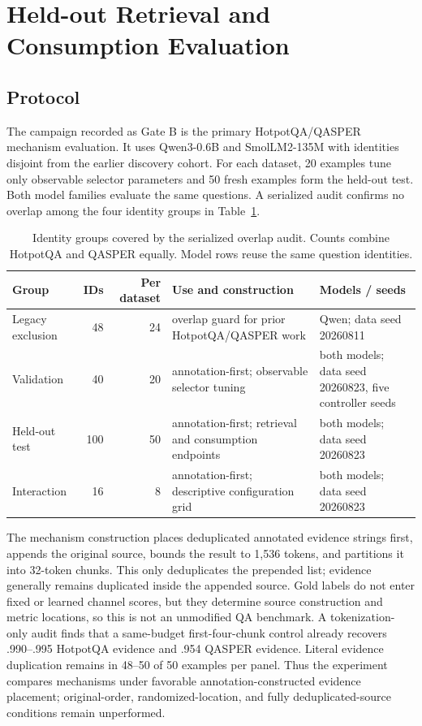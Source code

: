 \documentclass[11pt]{article}
\begin{document}
\section{Held-out Retrieval and Consumption Evaluation}
\subsection{Protocol}
The campaign recorded as Gate B is the primary HotpotQA/QASPER mechanism evaluation. It uses Qwen3-0.6B and SmolLM2-135M with identities disjoint from the earlier discovery cohort. For each dataset, 20 examples tune only observable selector parameters and 50 fresh examples form the held-out test. Both model families evaluate the same questions. A serialized audit confirms no overlap among the four identity groups in Table~\ref{tab:cohorts}.

\begin{table}[H]
\centering
\scriptsize
\caption{Identity groups covered by the serialized overlap audit. Counts combine HotpotQA and QASPER equally. Model rows reuse the same question identities.}
\label{tab:cohorts}
\begin{tabularx}{\linewidth}{lrr>{\raggedright\arraybackslash}X>{\raggedright\arraybackslash}X}
\toprule
Group & IDs & Per dataset & Use and construction & Models / seeds\\
\midrule
Legacy exclusion & 48 & 24 & overlap guard for prior HotpotQA/QASPER work & Qwen; data seed 20260811\\
Validation & 40 & 20 & annotation-first; observable selector tuning & both models; data seed 20260823, five controller seeds\\
Held-out test & 100 & 50 & annotation-first; retrieval and consumption endpoints & both models; data seed 20260823\\
Interaction & 16 & 8 & annotation-first; descriptive configuration grid & both models; data seed 20260823\\
\bottomrule
\end{tabularx}
\end{table}

The mechanism construction places deduplicated annotated evidence strings first, appends the original source, bounds the result to 1,536 tokens, and partitions it into 32-token chunks. This only deduplicates the prepended list; evidence generally remains duplicated inside the appended source. Gold labels do not enter fixed or learned channel scores, but they determine source construction and metric locations, so this is not an unmodified QA benchmark. A tokenization-only audit finds that a same-budget first-four-chunk control already recovers .990--.995 HotpotQA evidence and .954 QASPER evidence. Literal evidence duplication remains in 48--50 of 50 examples per panel. Thus the experiment compares mechanisms under favorable annotation-constructed evidence placement; original-order, randomized-location, and fully deduplicated-source conditions remain unperformed.
\end{document}
